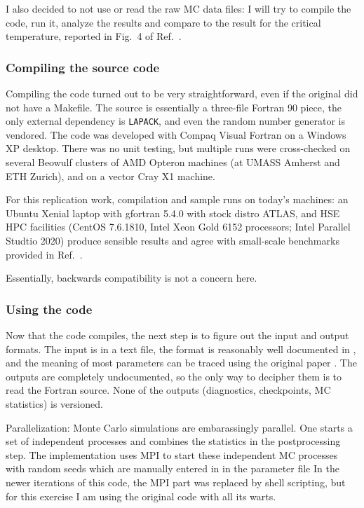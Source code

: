 I also decided to not use or read the raw MC data files: I will try to 
compile the code, run it, analyze the results and compare to the result
for the critical temperature, reported in Fig.\ 4 of Ref.\ \cite{NJP:2006}.
 

\subsubsection{Compiling the source code}

Compiling the code turned out to be very straightforward, even if the original did not
have a Makefile. The source is essentially a three-file Fortran 90 piece,
the only external dependency is \texttt{LAPACK}, and even the random number generator
is vendored. The code was developed with Compaq Visual Fortran on a Windows XP
desktop. There was no unit testing, but multiple runs were cross-checked on several Beowulf
clusters of AMD Opteron machines (at UMASS Amherst and ETH Zurich), and on a vector
Cray X1 machine. 

For this replication work, compilation and sample runs on today's machines: an
Ubuntu Xenial laptop with gfortran 5.4.0 with stock distro ATLAS,
and HSE HPC facilities (CentOS 7.6.1810, Intel Xeon Gold 6152
processors; Intel Parallel Studtio 2020) produce sensible results and agree with
small-scale benchmarks provided in Ref.\ \cite{MCWA}. 

Essentially, backwards compatibility is not a concern here.

\subsubsection{Using the code}

Now that the code compiles, the next step is to figure out the input and output
formats. The input is in a text file, the format is reasonably well documented
in \cite{MCWA}, and the meaning of most parameters can be traced using the 
original paper \cite{NJP:2006}. The outputs are completely undocumented, so the
only way to decipher them is to read the Fortran source. None
of the outputs (diagnostics, checkpoints, MC statistics) is versioned.

Parallelization: Monte Carlo simulations are embarassingly parallel. 
One starts a set of independent processes and 
combines the statistics in the postprocessing step. The implementation uses MPI
to start these independent MC processes with random seeds which are manually 
entered in in the parameter file
In the newer iterations of this code, the MPI part was replaced by shell
scripting, but for this exercise I am using the original code with all its warts.

